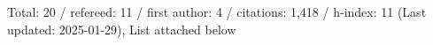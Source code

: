 Total: 20 / refereed: 11 / first author: 4 / citations: 1,418 / h-index: 11 (Last updated: 2025-01-29), List attached below